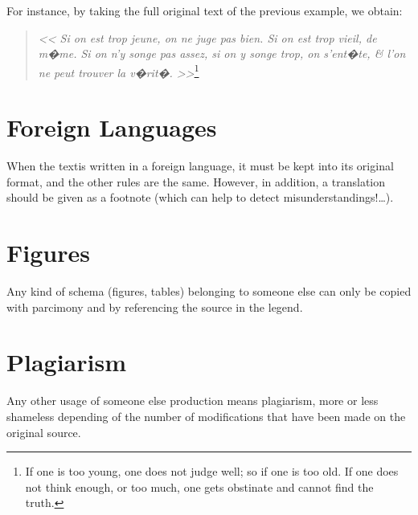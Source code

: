 For instance, by taking the full original text of the previous example, we obtain:
\begin{quote}
   \emph{<< Si on est trop jeune, on ne juge pas bien. Si on est trop vieil, de m�me. Si on n'y songe pas assez, si on y songe trop, on s'ent�te, \& l'on ne peut trouver la v�rit�. >>}\footnote{If one is too young, one does not judge well;  so if one is too old.  If one does not think enough, or too much, one gets obstinate and cannot find the truth.} \cite{Pascal-1671}
\end{quote}

\section{Foreign Languages}

When the textis written in a foreign language, it must be kept into its original format, and the other rules are the same.
However, in addition, a translation should be given as a footnote (which can help to detect misunderstandings!\ldots).

\section{Figures}

Any kind of schema (figures, tables) belonging to someone else can only be copied with parcimony and by referencing the source in the legend.

\section{Plagiarism}
\label{ann:Plagiarism}

Any other usage of someone else production means plagiarism, more or less shameless depending of the number of modifications that have been made on the original source.


